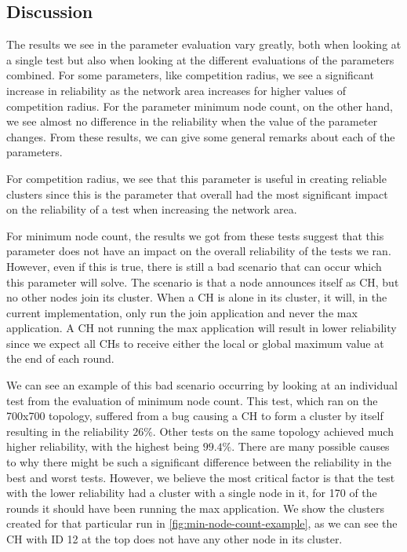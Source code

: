 \subsection{Discussion}
The results we see in the parameter evaluation vary greatly, both when looking at a single test but also when looking at the different evaluations of the parameters combined. For some parameters, like competition radius, we see a significant increase in reliability as the network area increases for higher values of competition radius. For the parameter minimum node count, on the other hand, we see almost no difference in the reliability when the value of the parameter changes. From these results, we can give some general remarks about each of the parameters.


For competition radius, we see that this parameter is useful in creating reliable clusters since this is the parameter that overall had the most significant impact on the reliability of a test when increasing the network area. 

For minimum node count, the results we got from these tests suggest that this parameter does not have an impact on the overall reliability of the tests we ran. However, even if this is true, there is still a bad scenario that can occur which this parameter will solve. The scenario is that a node announces itself as CH, but no other nodes join its cluster. When a CH is alone in its cluster, it will, in the current implementation, only run the join application and never the max application. A CH not running the max application will result in lower reliability since we expect all CHs to receive either the local or global maximum value at the end of each round.

We can see an example of this bad scenario occurring by looking at an individual test from the evaluation of minimum node count. This test, which ran on the 700x700 topology, suffered from a bug causing a CH to form a cluster by itself resulting in the reliability $26\%$. Other tests on the same topology achieved much higher reliability, with the highest being $99.4\%$. There are many possible causes to why there might be such a significant difference between the reliability in the best and worst tests. However, we believe the most critical factor is that the test with the lower reliability had a cluster with a single node in it, for 170 of the rounds it should have been running the max application. We show the clusters created for that particular run in \cref{fig:min-node-count-example}, as we can see the CH with ID 12 at the top does not have any other node in its cluster.

